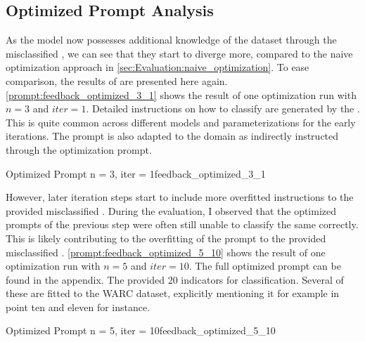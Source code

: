 \subsection{Optimized Prompt Analysis}
\label{subsec:Evaluation:simple_feedback:optimized-prompt-analysis}

As the model now possesses additional knowledge of the dataset through the misclassified \TLs, we can see that they start to diverge more, compared to the naive optimization approach in \autoref{sec:Evaluation:naive_optimization}.
To ease comparison, the results of \gpt are presented here again.
\autoref{prompt:feedback_optimized_3_1} shows the result of one optimization run with $n=3$ and $iter=1$.
Detailed instructions on how to classify \TLs are generated by the \LLM.
This is quite common across different models and parameterizations for the early iterations.
The prompt is also adapted to the \RtR domain as indirectly instructed through the optimization prompt.

\begin{prompt}{Optimized Prompt n = 3, iter = 1}{feedback_optimized_3_1}
    \\
    
\end{prompt}

However, later iteration steps start to include more overfitted instructions to the provided misclassified \TLs.
During the evaluation, I observed that the optimized prompts of the previous step were often still unable to classify the same \Tls correctly.
This is likely contributing to the overfitting of the prompt to the provided misclassified \TLs.
\autoref{prompt:feedback_optimized_5_10} shows the result of one optimization run with $n=5$ and $iter=10$.
The full optimized prompt can be found in the appendix. 
The \LLM provided 20 indicators for classification.
Several of these are fitted to the WARC dataset, explicitly mentioning it for example in point ten and eleven for instance.

\begin{prompt}{Optimized Prompt n = 5, iter = 10}{feedback_optimized_5_10}
    \\
    
\end{prompt}

